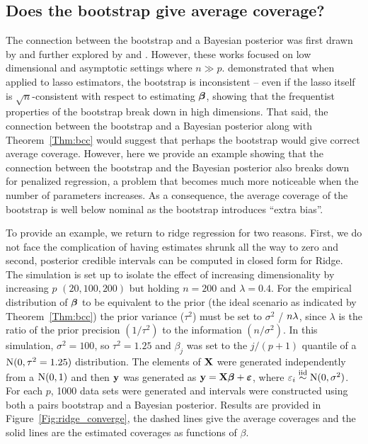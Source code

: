 \subsection{Does the bootstrap give average coverage?}
\label{Sec:boot-bias}

The connection between the bootstrap and a Bayesian posterior was first drawn by \cite{Rubin1981} and further explored by \cite{efron1982} and \cite{Lo1987}. However, these works focused on low dimensional and asymptotic settings where $n \gg p$. \cite{Chatterjee2010} demonstrated that when applied to lasso estimators, the bootstrap is inconsistent -- even if the lasso itself is $\sqrt{n}$-consistent with respect to estimating $\boldsymbol{\beta}$, showing that the frequentist properties of the bootstrap break down in high dimensions. That said, the connection between the bootstrap and a Bayesian posterior along with Theorem~\ref{Thm:bcc} would suggest that perhaps the bootstrap would give correct average coverage. However, here we provide an example showing that the connection between the bootstrap and the Bayesian posterior also breaks down for penalized regression, a problem that becomes much more noticeable when the number of parameters increases. As a consequence, the average coverage of the bootstrap is well below nominal as the bootstrap introduces ``extra bias''.


To provide an example, we return to ridge regression for two reasons. First, we do not face the complication of having estimates shrunk all the way to zero and second, posterior credible intervals can be computed in closed form for Ridge. The simulation is set up to isolate the effect of increasing dimensionality by increasing $p$ $(20, 100, 200)$ but holding $n = 200$ and $\lambda = 0.4$. For the empirical distribution of $\boldsymbol{\beta}$ to be equivalent to the prior (the ideal scenario as indicated by Theorem~\ref{Thm:bcc}) the prior variance ($\tau^2$) must be set to $\sigma^2$ / $n\lambda$, since $\lambda$ is the ratio of the prior precision $(1/\tau^2)$ to the information $(n / \sigma^2)$. In this simulation, $\sigma^2 = 100$, so $\tau^2 = 1.25$ and $\beta_j$ was set to the $j/(p+1)$ quantile of a $\textrm{N}(0,\tau^2=1.25)$ distribution. The elements of $\mathbf{X}$ were generated independently from a $\textrm{N}(0, 1)$ and then $\mathbf{y}$ was generated as $\mathbf{y} = \mathbf{X}\boldsymbol{\beta} + \boldsymbol{\varepsilon}$, where $\varepsilon_i \overset{\text{iid}}{\sim} \textrm{N}(0, \sigma^2)$. For each $p$, 1000 data sets were generated and intervals were constructed using both a pairs bootstrap and a Bayesian posterior. Results are provided in Figure~\ref{Fig:ridge_converge}, the dashed lines give the average coverages and the solid lines are the estimated coverages as functions of $\beta$.

